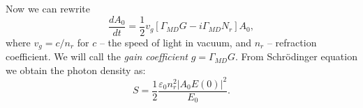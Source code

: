 Now we can rewrite
\begin{equation}
	\frac{d A_0}{d t} = \frac{1}{2} v_g [\Gamma_{MD}G - i \Gamma_{MD} N_r]A_0,
\end{equation}
where $v_g = c/n_r$ for $c$ -- the speed of light in vacuum, and $n_{r}$ -- refraction coefficient. We will call the \textit{gain coefficient} $g = \Gamma_{MD}G$.
From Schr\"odinger equation we obtain the photon density as:
\begin{equation*}
	S = \frac{1}{2} \frac{\varepsilon_0 n_r^2 |A_0 E(0)|^2}{E_0}.
\end{equation*}